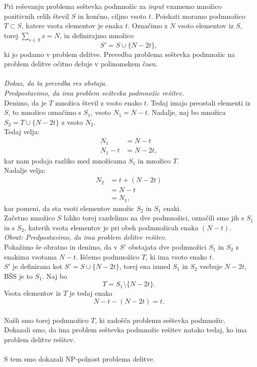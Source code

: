 \documentclass[a4paper,11pt]{article}
\begin{document}
Pri reševanju problema seštevka podmnožic za \textit{input} vzamemo množico pozitivnih celih števil $S$ in končno, ciljno vsoto $t$. 
Poiskati moramo podmnožico $T \subset S$, katere vsota elementov je enaka $t$. 
Označimo z $N$ vsoto elementov iz $S$, torej $\sum_{s \in S} s = N$, in definirajmo množico 
$$S' = S \cup \{ N - 2t \},$$ 
ki jo podamo v problem delitve. 
Prevedba problema seštevka podmnožic na problem delitve očitno deluje v polinomskem času.
\\
\\
\textit{Dokaz, da ta prevedba res obstaja.}
\\
\textit{Predpostavimo, da ima problem seštevka podmnožic rešitev.}
\\
Denimo, da je $T$ množica števil z vsoto enako $t$. Tedaj imajo preostali elementi iz $S$, to množico označimo s $S_1$, vsoto $N_1 = N - t$. 
Nadalje, naj bo množica $S_2 = T \cup \{ N - 2t \}$ z vsoto $N_2$.
\\
Tedaj velja:
\begin{align*}
    N_1  &= N - t 
    \\
    N_1  - t &= N - 2t, 
\end{align*}
\noindent
kar nam podaja razliko med množicama $S_1$ in množico $T$.
\\
Nadalje velja:
\begin{align*}
    N_2 &= t + (N - 2t) 
\\
    &= N - t 
\\
    &= N_1,
\end{align*}
\noindent
kar pomeni, da sta vsoti elementov množic $S_2$ in $S_1$ enaki.
\\
Začetno množico $S$ lahko torej razdelimo na dve podmnožici, označili smo jih s $S_1$ in s $S_2$, katerih vsota elementov je pri obeh podmnožicah enaka $(N - t)$. 
\\
\textit{Obrat: Predpostavimo, da ima problem delitve rešitev.}
\\
Pokažimo še obratno in denimo, da v $S'$ obstajata dve podmnožici $S_1$ in $S_2$ z enakima vsotama $N - t$. Iščemo podmnožico $T$, ki ima vsoto enako $t$.
\\
$S'$ je definirana kot $S' = S \cup \{ N - 2t \}$, torej ena izmed $S_1$ in $S_2$ vsebuje $N - 2t$, BŠS je to $S_1$. Naj bo 
$$T = S_1 \setminus \{ N - 2t \}.$$
Vsota elementov iz $T$ je tedaj enaka 
$$N - t - (N - 2t) = t.$$ 
\\
Našli smo torej podmnožico $T$, ki zadošča problemu seštevka podmnožic.
\\
Dokazali smo, da ima problem seštevka podmnožic rešitev natako tedaj, ko ima problem delitve rešitev.
\\
\\
S tem smo dokazali NP-polnost problema delitve.
\end{document}
